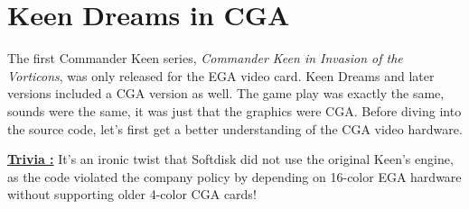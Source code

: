 \documentclass[book.tex]{subfiles}
\begin{document}
\pagebreak
\section{Keen Dreams in CGA}
The first Commander Keen series, \textit{Commander Keen in Invasion of the Vorticons}, was only released for the EGA video card. Keen Dreams and later versions included a CGA version as well. The game play was exactly the same, sounds were the same, it was just that the graphics were CGA. Before diving into  the source code, let's first get a better understanding of the CGA video hardware.\\

\par
\textbf{\underline{Trivia :}} It's an ironic twist that Softdisk did not use the original Keen's engine, as the code violated the company policy by depending on 16-color EGA hardware without supporting older 4-color CGA cards!\\
\par
\end{document}
